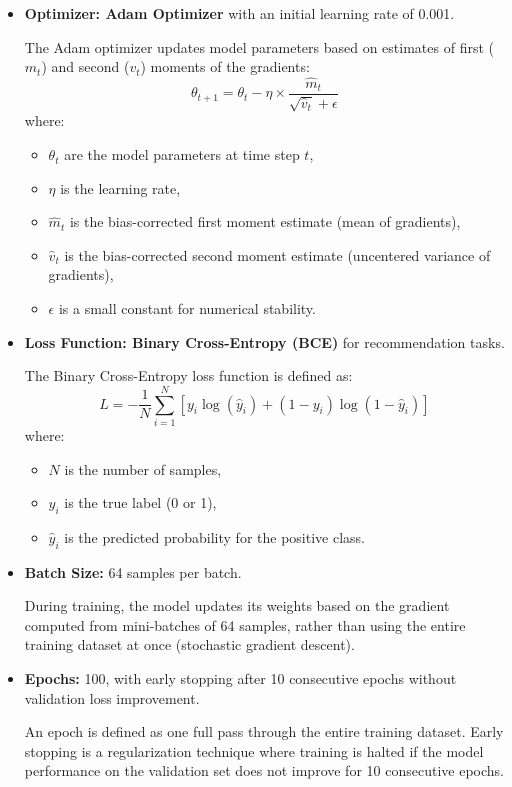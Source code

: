 \begin{itemize}
    \item \textbf{Optimizer: Adam Optimizer} with an initial learning rate of 0.001.
    
    The Adam optimizer updates model parameters based on estimates of first ($m_t$) and second ($v_t$) moments of the gradients:
    \[
    \theta_{t+1} = \theta_t - \eta \times \frac{\hat{m}_t}{\sqrt{\hat{v}_t} + \epsilon}
    \]
    where:
    \begin{itemize}
        \item $\theta_t$ are the model parameters at time step $t$,
        \item $\eta$ is the learning rate,
        \item $\hat{m}_t$ is the bias-corrected first moment estimate (mean of gradients),
        \item $\hat{v}_t$ is the bias-corrected second moment estimate (uncentered variance of gradients),
        \item $\epsilon$ is a small constant for numerical stability.
    \end{itemize}

    \item \textbf{Loss Function: Binary Cross-Entropy (BCE)} for recommendation tasks.
    
    The Binary Cross-Entropy loss function is defined as:
    \[
    L = - \frac{1}{N} \sum_{i=1}^{N} \left[ y_i \log(\hat{y}_i) + (1 - y_i) \log(1 - \hat{y}_i) \right]
    \]
    where:
    \begin{itemize}
        \item $N$ is the number of samples,
        \item $y_i$ is the true label (0 or 1),
        \item $\hat{y}_i$ is the predicted probability for the positive class.
    \end{itemize}

    \item \textbf{Batch Size:} 64 samples per batch.
    
    During training, the model updates its weights based on the gradient computed from mini-batches of 64 samples, rather than using the entire training dataset at once (stochastic gradient descent).

    \item \textbf{Epochs:} 100, with early stopping after 10 consecutive epochs without validation loss improvement.
    
    An epoch is defined as one full pass through the entire training dataset. Early stopping is a regularization technique where training is halted if the model performance on the validation set does not improve for 10 consecutive epochs.
\end{itemize}


